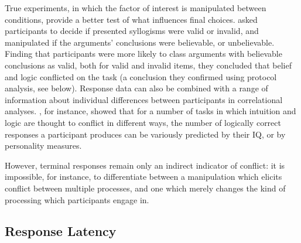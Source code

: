 
True experiments, in which the factor of interest
is manipulated between conditions,
provide a better test of what influences final choices.
\citet{Evans1983} asked participants to decide
if presented syllogisms were valid or invalid,
and manipulated if the arguments' conclusions
were believable, or unbelievable.
Finding that participants were more likely to class arguments
with believable conclusions as valid,
both for valid and invalid items,
they concluded that belief and logic conflicted on the task
(a conclusion they confirmed using protocol analysis, see below).
Response data can also be combined with a range of
information about individual differences between participants
in correlational analyses.
\citet{Stanovich1999,Stanovich2000,Stanovich2008}, for instance,
showed that for a number of tasks in which
intuition and logic are thought to conflict in different ways,
the number of logically correct responses a participant produces
can be variously predicted by their IQ,
or by personality measures.

However, terminal responses remain only an indirect indicator of conflict:
it is impossible, for instance, to differentiate between
a manipulation which elicits conflict between multiple processes,
and one which merely changes the kind of processing
which participants engage in.


\subsection{Response Latency}\label{response-latency}


